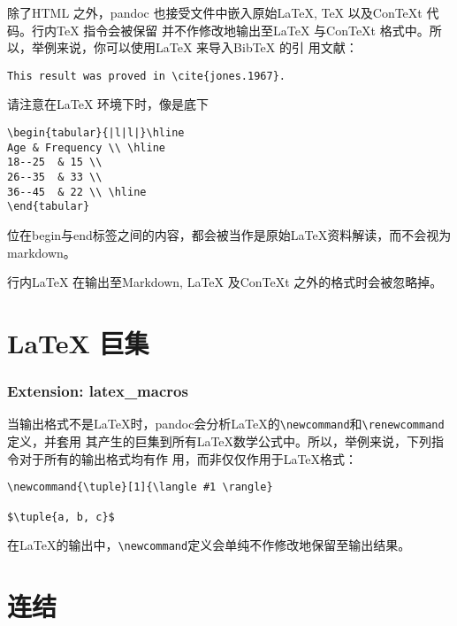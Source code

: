 \documentclass[fancyhdr,bookmark]{ctexbook}
\begin{document}
除了HTML 之外，pandoc 也接受文件中嵌入原始LaTeX, TeX 以及ConTeXt
代码。行内TeX 指令会被保留 并不作修改地输出至LaTeX 与ConTeXt
格式中。所以，举例来说，你可以使用LaTeX 来导入BibTeX 的引 用文献：

\begin{lstlisting}
This result was proved in \cite{jones.1967}.
\end{lstlisting}

请注意在LaTeX 环境下时，像是底下

\begin{lstlisting}
\begin{tabular}{|l|l|}\hline
Age & Frequency \\ \hline
18--25  & 15 \\
26--35  & 33 \\
36--45  & 22 \\ \hline
\end{tabular}
\end{lstlisting}

位在begin与end标签之间的内容，都会被当作是原始LaTeX资料解读，而不会视为markdown。

行内LaTeX 在输出至Markdown, LaTeX 及ConTeXt 之外的格式时会被忽略掉。

\section{LaTeX 巨集}\label{latex-ux5de8ux96c6}

\subsubsection{Extension:
latex\_macros}\label{extension-latexux5fmacros}

当输出格式不是LaTeX时，pandoc会分析LaTeX的\lstinline!\newcommand!和\lstinline!\renewcommand!定义，并套用
其产生的巨集到所有LaTeX数学公式中。所以，举例来说，下列指令对于所有的输出格式均有作
用，而非仅仅作用于LaTeX格式：

\begin{lstlisting}
\newcommand{\tuple}[1]{\langle #1 \rangle}

$\tuple{a, b, c}$
\end{lstlisting}

在LaTeX的输出中，\lstinline!\newcommand!定义会单纯不作修改地保留至输出结果。

\section{连结}\label{ux8fdeux7ed3}
\end{document}
